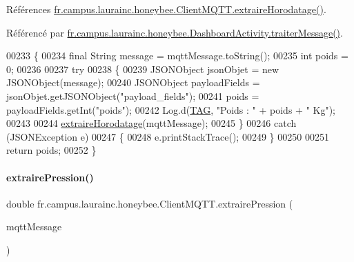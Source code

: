 Références \hyperlink{classfr_1_1campus_1_1laurainc_1_1honeybee_1_1_client_m_q_t_t_ace17d633909a5be8035518b9a6b528c2}{fr.\+campus.\+laurainc.\+honeybee.\+Client\+M\+Q\+T\+T.\+extraire\+Horodatage()}.



Référencé par \hyperlink{classfr_1_1campus_1_1laurainc_1_1honeybee_1_1_dashboard_activity_a50d4c14e993ff1779ae5dce8cee11216}{fr.\+campus.\+laurainc.\+honeybee.\+Dashboard\+Activity.\+traiter\+Message()}.


\begin{DoxyCode}
00233     \{
00234         \textcolor{keyword}{final} String message = mqttMessage.toString();
00235         \textcolor{keywordtype}{int} poids = 0;
00236 
00237         \textcolor{keywordflow}{try}
00238         \{
00239             JSONObject jsonObjet = \textcolor{keyword}{new} JSONObject(message);
00240             JSONObject payloadFields = jsonObjet.getJSONObject(\textcolor{stringliteral}{"payload\_fields"});
00241             poids = payloadFields.getInt(\textcolor{stringliteral}{"poids"});
00242             Log.d(\hyperlink{classfr_1_1campus_1_1laurainc_1_1honeybee_1_1_client_m_q_t_t_a378324f705f8d7870c5f7be0cea02890}{TAG}, \textcolor{stringliteral}{"Poids : "} + poids + \textcolor{stringliteral}{" Kg"});
00243 
00244             \hyperlink{classfr_1_1campus_1_1laurainc_1_1honeybee_1_1_client_m_q_t_t_ace17d633909a5be8035518b9a6b528c2}{extraireHorodatage}(mqttMessage);
00245         \}
00246         \textcolor{keywordflow}{catch} (JSONException e)
00247         \{
00248             e.printStackTrace();
00249         \}
00250 
00251         \textcolor{keywordflow}{return} poids;
00252     \}
\end{DoxyCode}
\mbox{\label{classfr_1_1campus_1_1laurainc_1_1honeybee_1_1_client_m_q_t_t_a630a29e060e4a0c2891cd79fad8d3585}} 
\paragraph{\texorpdfstring{extraire\+Pression()}{extrairePression()}}
{\footnotesize\ttfamily double fr.\+campus.\+laurainc.\+honeybee.\+Client\+M\+Q\+T\+T.\+extraire\+Pression (\begin{DoxyParamCaption}\item[{Mqtt\+Message}]{mqtt\+Message }\end{DoxyParamCaption})}



